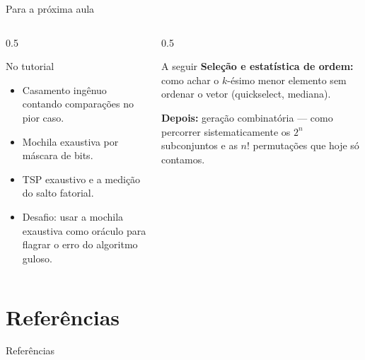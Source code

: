 \documentclass[aspectratio=169]{beamer}
\begin{document}
\begin{frame}{Para a próxima aula}
  \begin{columns}[T]
    \begin{column}{0.5\textwidth}
      \begin{block}{No tutorial}
        \begin{itemize}
          \item Casamento ingênuo contando comparações no pior caso.
          \item Mochila exaustiva por máscara de bits.
          \item TSP exaustivo e a medição do salto fatorial.
          \item Desafio: usar a mochila exaustiva como oráculo para
            flagrar o erro do algoritmo guloso.
        \end{itemize}
      \end{block}
    \end{column}
    \begin{column}{0.5\textwidth}
      \begin{exampleblock}{A seguir}
        \textbf{Seleção e estatística de ordem:} como achar o $k$-ésimo menor
        elemento sem ordenar o vetor (quickselect, mediana).

        \medskip
        \textbf{Depois:} geração combinatória --- como percorrer sistematicamente
        os $2^n$ subconjuntos e as $n!$ permutações que hoje só contamos.
      \end{exampleblock}
    \end{column}
  \end{columns}
\end{frame}

\section*{Referências}
\begin{frame}[allowframebreaks]{Referências}
  \footnotesize
  \nocite{*}
  
  
\end{frame}
\end{document}
